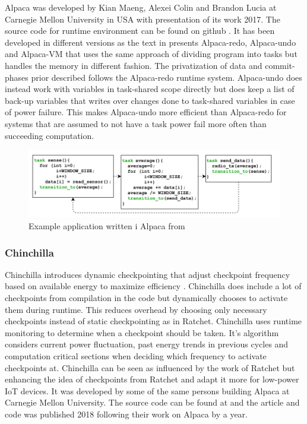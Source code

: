 \documentclass[article,a4paper]{IEEEtran}
\begin{document}
\newline\newline
Alpaca was developed by Kian Maeng, Alexei Colin and Brandon Lucia at Carnegie Mellon University in USA with presentation of its work 2017. The source code for runtime environment can be found on github \cite{Alpacasrc}. It has been developed in different versions as the text in \cite{Alpaca} presents Alpaca-redo, Alpaca-undo and Alpaca-VM that uses the same approach of dividing program into tasks but handles the memory in different fashion. The privatization of data and commit-phases prior described follows the Alpaca-redo runtime system. Alpaca-undo does instead work with variables in task-shared scope directly but does keep a list of back-up variables that writes over changes done to task-shared variables in case of power failure. This makes Alpaca-undo more efficient than Alpaca-redo for systems that are assumed to not have a task power fail more often than succeeding computation.  
\begin{figure}
    \includegraphics[width=\columnwidth]{Alpacatasksexample.png}
    \caption{ Example application written i Alpaca from \cite{Alpaca} }
    \label{fig4_Alpaca_tasks}
\end{figure}
\newline
\subsubsection{\textbf{Chinchilla}}
Chinchilla introduces dynamic checkpointing that adjust checkpoint frequency based on available energy to maximize efficiency \cite{Chinchilla}. Chinchilla does include a lot of checkpoints from compilation in the code but dynamically chooses to activate them during runtime. This reduces overhead by choosing only necessary checkpoints instead of static checkpointing as in Ratchet. Chinchilla uses runtime monitoring to determine when a checkpoint should be taken. It's algorithm considers current power fluctuation, past energy trends in previous cycles and computation critical sections when deciding which frequency to activate checkpoints at. 
\newline\newline
Chinchilla can be seen as influenced by the work of Ratchet but enhancing the idea of checkpoints from Ratchet and adapt it more for low-power IoT devices. It was developed by some of the same persons building Alpaca at Carnegie Mellon University. The source code can be found at \cite{Chinchillasrc} and the article and code was published 2018 following their work on Alpaca by a year.  
\end{document}
